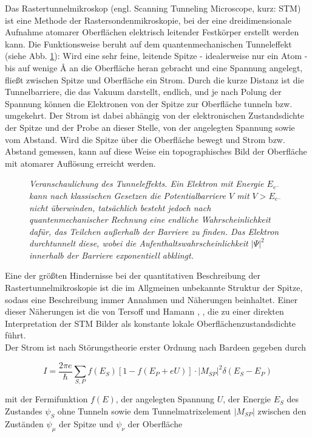 Das Rastertunnelmikroskop (engl. Scanning Tunneling Microscope, kurz: STM) ist eine Methode der
Rastersondenmikroskopie, bei der eine dreidimensionale Aufnahme atomarer Oberflächen elektrisch
leitender Festkörper erstellt werden kann. Die Funktionsweise beruht auf dem quantenmechanischen
Tunneleffekt (siehe Abb. \ref{tunnel}): Wird eine sehr feine, leitende Spitze - idealerweise nur ein
Atom - bis auf wenige {\AA} an die Oberfläche heran gebracht und eine Spannung angelegt, fließt zwischen Spitze und
Oberfläche ein Strom. Durch die kurze Distanz ist die Tunnelbarriere, die das Vakuum darstellt,
endlich, und je nach Polung der Spannung können die Elektronen von der Spitze zur Oberfläche tunneln bzw.
umgekehrt. Der Strom ist dabei abhängig von der elektronischen Zustandsdichte der Spitze und der
Probe an dieser Stelle, von der angelegten Spannung sowie vom Abstand. Wird die Spitze über die
Oberfläche bewegt und Strom bzw.
Abstand gemessen, kann auf diese Weise ein topographisches Bild der Oberfläche mit atomarer
Auflösung erreicht werden. 

\begin{figure}[H]
\centering

\caption{\textit{Veranschaulichung des Tunneleffekts. Ein Elektron mit Energie $E_{e^-}$ kann nach
klassischen Gesetzen die Potentialbarriere $V$ mit $V>E_{e^-}$ nicht überwinden, tatsächlich besteht
jedoch nach quantenmechanischer Rechnung eine endliche Wahrscheinlichkeit dafür, das Teilchen
außerhalb der Barriere zu finden. Das Elektron durchtunnelt diese, wobei die
Aufenthaltswahrscheinlichkeit $|\Psi|^2$ innerhalb der Barriere exponentiell abklingt. }}
\label{tunnel}
\end{figure}


Eine der größten Hindernisse bei der quantitativen Beschreibung der Rastertunnelmikroskopie ist die
im Allgmeinen unbekannte Struktur der Spitze, sodass eine Beschreibung immer Annahmen und Näherungen
beinhaltet. Einer dieser Näherungen ist die von Tersoff und Hamann \cite{Ter83}, \cite{Ter85}, die
zu einer direkten Interpretation der STM Bilder als konstante lokale Oberflächenzustandsdichte führt.\\
Der Strom ist nach Störungstheorie erster Ordnung nach Bardeen \cite{Bar} gegeben durch

\[I=\frac{2\pi e}{\hbar}\sum_{S,P}
f(E_{S})[1-f(E_{P}+eU)]\cdot|M_{SP}|^2\delta(E_{S}-E_{P})\]

mit der Fermifunktion $f(E)$, der angelegten Spannung $U$, der Energie
$E_{S}$ des Zustandes $\psi_{S}$ ohne Tunneln sowie dem Tunnelmatrixelement $|M_{SP}|$
zwischen den Zuständen $\psi_{\mu}$ der Spitze und $\psi_{\nu}$ der Oberfläche

